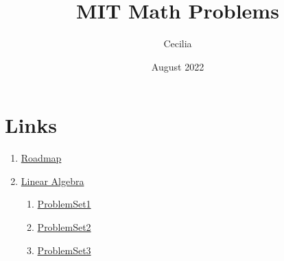 \documentclass{article}
\title{MIT Math Problems}
\author{Cecilia}
\date{August 2022}
\begin{document}
\maketitle

\section*{Links}
    \begin{enumerate}
        \item \href{https://math.mit.edu/academics/undergrad/roadmaps.php}{Roadmap}
        \item \href{https://ocw.mit.edu/courses/18-700-linear-algebra-fall-2013/}{Linear Algebra}
        \begin{enumerate}
            \item \hyperlink{LinearAlgebra-ProblemSet1.1}{ProblemSet1}
            \item \hyperlink{LinearAlgebra-ProblemSet2.1}{ProblemSet2}
            \item \hyperlink{LinearAlgebra-ProblemSet3.1}{ProblemSet3}
        \end{enumerate}
    \end{enumerate}

%
%

























\end{document}
